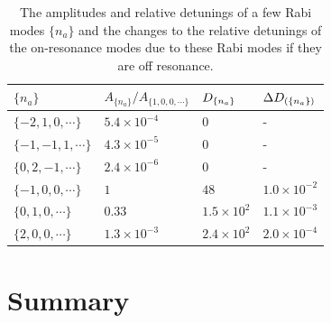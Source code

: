 \begin{table}
    \centering
    \setlength\tabcolsep{10pt}
    \begin{tabular}{llll}
    \hline
    \hline
     $\{n_a\}$ & $A_{\{n_a\}}/A_{\{1,0,0,\cdots\}}$  & $D_{\{n_a\}}$ & $\Delta D_{(\{n_a\})}$  \\
    \hline
    $\{-2, 1, 0,\cdots\}$ & $5.4\times 10^{-4}$ & 0 &  - \\
    $\{-1, -1, 1,\cdots\}$ &  $4.3\times 10^{-5}$ & 0 & - \\
    $\{0, 2, -1,\cdots\}$ & $2.4\times 10^{-6}$ & 0 & - \\
    \hline
     $\{-1,0, 0, \cdots\}$ & $1$ & $48$ &  $1.0\times 10^{-2}$ \\
     $\{0,1, 0, \cdots\}$ & $0.33$ & $1.5\times 10^2$ &  $1.1\times 10^{-3}$  \\
     $\{2,0, 0, \cdots\}$ & $1.3\times 10^{-3}$ & $2.4\times 10^{2}$ & $2.0\times 10^{-4}$ \\
     \hline
     \hline
    \end{tabular}
    \caption{\label{table:castle-wall-relative-detunings-some}The amplitudes and relative detunings of a few Rabi modes $\{n_a\}$ and the changes to the relative detunings of the on-resonance modes due to these Rabi modes if they are off resonance.}
\end{table}


\section{\label{chap:matter-sec:conclusions}Summary}

